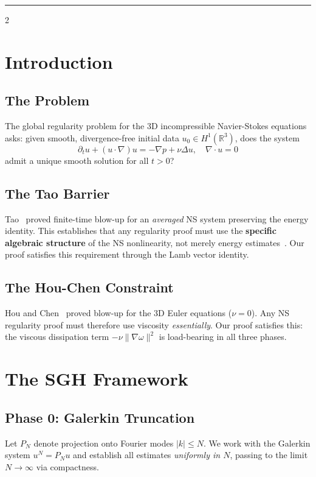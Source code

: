\documentclass[10pt]{article}
\begin{document}
\vspace{8pt}
\rule{\textwidth}{0.3pt}
\vspace{4pt}

\begin{multicols}{2}

\section{Introduction}

\subsection{The Problem}
The global regularity problem for the 3D incompressible Navier-Stokes equations asks: given smooth, divergence-free initial data $u_0 \in H^1(\mathbb{R}^3)$, does the system
\begin{equation}
\partial_t u + (u \cdot \nabla)u = -\nabla p + \nu \Delta u, \quad \nabla \cdot u = 0
\label{eq:ns}
\end{equation}
admit a unique smooth solution for all $t > 0$?

\subsection{The Tao Barrier}
Tao~\cite{tao2016} proved finite-time blow-up for an \textit{averaged} NS system preserving the energy identity. This establishes that any regularity proof must use the \textbf{specific algebraic structure} of the NS nonlinearity, not merely energy estimates~\cite{tao2016}. Our proof satisfies this requirement through the Lamb vector identity.

\subsection{The Hou-Chen Constraint}
Hou and Chen~\cite{houchen2023} proved blow-up for the 3D Euler equations ($\nu = 0$). Any NS regularity proof must therefore use viscosity \textit{essentially}. Our proof satisfies this: the viscous dissipation term $-\nu \|\nabla \omega\|^2$ is load-bearing in all three phases.

\section{The SGH Framework}

\subsection{Phase 0: Galerkin Truncation}
Let $P_N$ denote projection onto Fourier modes $|k| \leq N$. We work with the Galerkin system $u^N = P_N u$ and establish all estimates \textit{uniformly in $N$}, passing to the limit $N \to \infty$ via compactness.


\end{multicols}
\end{document}
